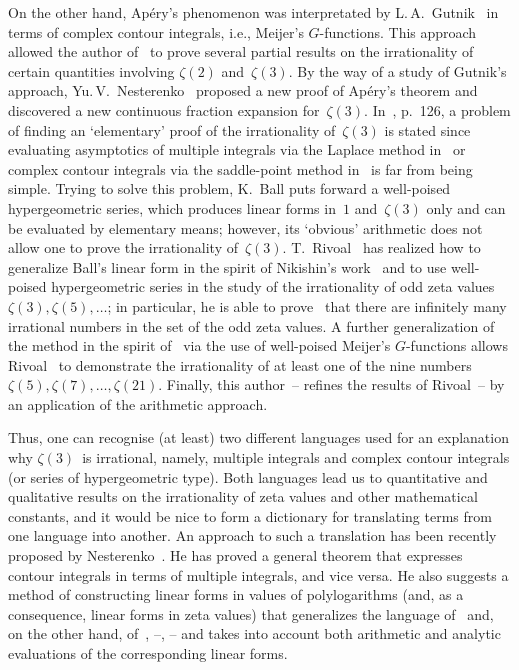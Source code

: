 \documentclass[a4paper,twoside]{article}
\numberwithin{equation}{section}
\renewcommand{\[}{\lfloor}
\renewcommand{\]}{\rfloor}
\newcommand{\<}{\langle}
\renewcommand{\>}{\rangle}
\begin{document}
On the other hand, Ap\'ery's phenomenon was interpretated
by L.\,A.~Gutnik~\cite{Gu} in terms of complex contour integrals,
i.e., Meijer's $G$-functions. This approach allowed the author of~\cite{Gu}
to prove several partial results on the irrationality of certain quantities
involving $\zeta(2)$ and~$\zeta(3)$. By the way of a study
of Gutnik's approach, Yu.\,V.~Nesterenko~\cite{Ne1} proposed
a new proof of Ap\'ery's theorem and discovered
a new continuous fraction expansion for~$\zeta(3)$. In~\cite{FN}, p.~126,
a problem of finding an `elementary' proof
of the irrationality of~$\zeta(3)$ is stated since evaluating asymptotics
of multiple integrals via the Laplace method in~\cite{Be} or
complex contour integrals via the saddle-point method in~\cite{Ne1}
is far from being simple. Trying to solve this problem, K.~Ball
puts forward a well-poised hypergeometric series, which produces linear
forms in~$1$ and~$\zeta(3)$ only and can be evaluated
by elementary means;
however, its `obvious' arithmetic does not allow one to prove
the irrationality of~$\zeta(3)$. T.~Rivoal~\cite{Ri1} has realized
how to generalize Ball's linear form in the spirit of
Nikishin's work~\cite{Ni} and to use well-poised
hypergeometric series in the study of the irrationality of odd
zeta values $\zeta(3),\zeta(5),\dots$; in particular, he is able
to prove~\cite{Ri1} that there are infinitely many irrational numbers
in the set of the odd zeta values. A further generalization of the method
in the spirit of~\cite{Gu,Ne1} via the use of well-poised
Meijer's $G$-functions allows Rivoal~\cite{Ri4} to demonstrate
the irrationality of at least one of the nine numbers
$\zeta(5),\zeta(7),\dots,\zeta(21)$. Finally, this
author~\cite{Zu1}--\cite{Zu4} refines the results of
Rivoal~\cite{Ri1}--\cite{Ri4} by an application of
the arithmetic approach.

Thus, one can recognise (at least) two different languages used for
an explanation why $\zeta(3)$~is irrational, namely, multiple integrals
and complex contour integrals (or series of hypergeometric type).
Both languages lead us to quantitative and qualitative results
on the irrationality of zeta values and other mathematical constants,
and it would be nice to form a dictionary for translating terms from
one language into another. An approach to such a translation
has been recently proposed by Nesterenko~\cite{Ne2,Ne3}.
He has proved a general theorem that expresses contour integrals
in terms of multiple integrals, and vice versa. He also
suggests a method of constructing linear forms in values
of polylogarithms (and, as a consequence, linear forms in zeta values)
that generalizes the language
of~\cite{Ni,Gu,Ne1} and, on the other hand,
of~\cite{Be}, \cite{Ha1}--\cite{Ha5}, \cite{RV1}--\cite{RV3}
and takes into account both arithmetic and analytic evaluations
of the corresponding linear forms.
\end{document}
